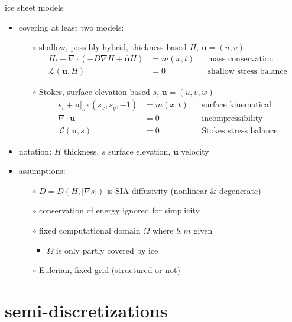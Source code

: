 \documentclass[hide notes,intlimits,usenames,dvipsnames]{beamer}
\newcommand{\Div}{\nabla\cdot}
\newcommand{\grad}{\nabla}
\renewcommand{\bar}{\overline}
\begin{document}
\begin{frame}{ice sheet models}

\begin{itemize}
\item covering at least two models:
    \begin{itemize}
    \item[$\circ$] shallow, possibly-hybrid, thickness-based \hfill {\scriptsize\color{Gray} $H,\, \mathbf{u}=(u,v)$}
        \begin{align*}
        H_t + \Div (-D \grad H + \bar{\mathbf{u}} H) &= m(x,t) && \text{mass conservation} \\
        \mathcal{L}(\mathbf{u},H) &= 0      && \text{shallow stress balance}
        \end{align*}
    \item[$\circ$] Stokes, surface-elevation-based \hfill {\scriptsize\color{Gray} $s,\, \mathbf{u}=(u,v,w)$}
        \begin{align*}
        s_t + \mathbf{u}\big|_s \cdot (s_x,s_y,-1) &= m(x,t) && \text{surface kinematical} \\
        \Div \mathbf{u} &= 0            && \text{incompressibility} \\
        \mathcal{L}(\mathbf{u},s) &= 0  && \text{Stokes stress balance}
        \end{align*}
    \end{itemize}
\item notation: $H$ thickness, $s$ surface elevation, $\mathbf{u}$ velocity
\item assumptions:
    \begin{itemize}
    \item[$\circ$] $D=D(H,|\grad s|)$ is SIA diffusivity (nonlinear \& degenerate)
    \item[$\circ$] conservation of energy ignored for simplicity
    \item[$\circ$] fixed computational domain $\Omega$ where $b,m$ given
        \begin{itemize}
        \item $\Omega$ is only partly covered by ice
        \end{itemize}
    \item[$\circ$] Eulerian, fixed grid (structured or not)
    \end{itemize}
\end{itemize}
\end{frame}


\section{semi-discretizations}
\end{document}
